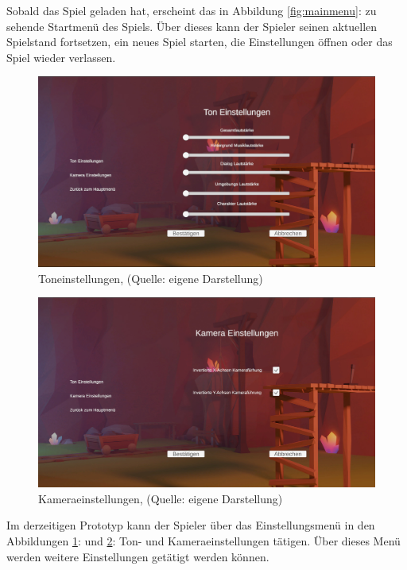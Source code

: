Sobald das Spiel geladen hat, erscheint das in Abbildung \ref{fig:mainmenu}:  zu sehende Startmenü des Spiels. Über dieses kann der Spieler seinen aktuellen Spielstand fortsetzen, ein neues Spiel starten, die Einstellungen öffnen oder das Spiel wieder verlassen.

\begin{figure}[ht]
\centering
\includegraphics[width=1\linewidth]{content/pictures/SoundSetting.jpg}
\caption{Toneinstellungen, (Quelle: eigene Darstellung)}
\label{fig:sound_settings}
\end{figure}

\begin{figure}[ht]
\centering
\includegraphics[width=1\linewidth]{content/pictures/CamSetting.jpg}
\caption{Kameraeinstellungen, (Quelle: eigene Darstellung)}
\label{fig:cam_settings}
\end{figure}

Im derzeitigen Prototyp kann der Spieler über das Einstellungsmenü in den Abbildungen \ref{fig:sound_settings}:  und \ref{fig:cam_settings}:  Ton- und Kameraeinstellungen tätigen. Über dieses Menü werden weitere Einstellungen getätigt werden können.

